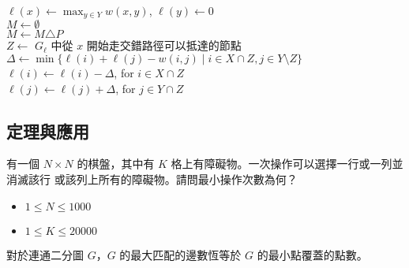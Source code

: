 \documentclass[standalone]{beamer}
\begin{document}
\begin{frame}{}
  \begin{algorithm}[H]

    $\ell(x) \gets \max_{y \in Y}w(x, y)$, $\ell(y) \gets 0$ \\
    $M \gets \emptyset$ \\

     {
       {
         {
           {
            $M \gets M \triangle P$ \\
            \Break
          }
           {
            $Z \gets$ $G_\ell$ 中從 $x$ 開始走交錯路徑可以抵達的節點 \\
            $\Delta \gets \min\{\ell(i) + \ell(j) - w(i, j) \mid i \in X \cap Z, j \in Y \setminus Z\}$ \\
          }
           {
            $\ell(i) \gets \ell(i) - \Delta$, for $i \in X \cap Z$ \\
            $\ell(j) \gets \ell(j) + \Delta$, for $j \in Y \cap Z$ \\
          }
        }
      }
    }
  \end{algorithm}
\end{frame}

\subsection{定理與應用}

\begin{frame}{}
   {
    \begin{problem}[砲打皮皮]
      有一個 $N \times N$ 的棋盤，其中有 $K$ 格上有障礙物。一次操作可以選擇一行或一列並消滅該行
      或該列上所有的障礙物。請問最小操作次數為何？

      \begin{itemize}
        \item $1 \leq N \leq 1000$
        \item $1 \leq K \leq 20000$
      \end{itemize}
    \end{problem}
  }
   {
    \begin{theorem}
      對於連通二分圖 $G$，$G$ 的最大匹配的邊數恆等於 $G$ 的最小點覆蓋的點數。
    \end{theorem}
  }
\end{frame}
\end{document}
